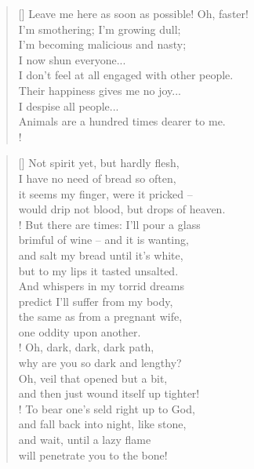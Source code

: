 \documentclass[]{article}
\newcommand{\poemauthorcenter}[1]{\nopagebreak{\centering\footnotesize\textsc{#1}\par}}
\begin{document}
\vspace*{0.03\textheight}
\settowidth{\versewidth}{Leave me here as soon as possible! Oh, faster!}
\begin{verse}[\versewidth]
Leave me here as soon as possible! Oh, faster!\\
I'm smothering; I'm growing dull;\\
I'm becoming malicious and nasty;\\
I now shun everyone... \\
I don't feel at all engaged with other people.\\
Their happiness gives me no joy... \\
I despise all people... \\
Animals are a hundred times dearer to me.\\!
\end{verse}
\bigskip \bigskip

\settowidth{\versewidth}{predict I'll suffer from my body }
\begin{verse}[\versewidth]
Not spirit yet, but hardly flesh,\\
I have no need of bread so often,\\
it seems my finger, were it pricked -- \\
would drip not blood, but drops of heaven.\\!
But there are times: I'll pour a glass\\
brimful of wine -- and it is wanting,\\
and salt my bread until it's white,\\
but to my lips it tasted unsalted.\\
And whispers in my torrid dreams\\
predict I'll suffer from my body,\\
the same as from a pregnant wife,\\
one oddity upon another.\\!
Oh, dark, dark, dark path,\\
why are you so dark and lengthy?\\
Oh, veil that opened but a bit,\\
and then just wound itself up tighter!\\!
To bear one's seld right up to God,\\
and fall back into night, like stone,\\
and wait, until a lazy flame\\
will penetrate you to the bone!\\
\end{verse}
\poemauthorcenter{\textit{1922}}
\newpage
\end{document}

